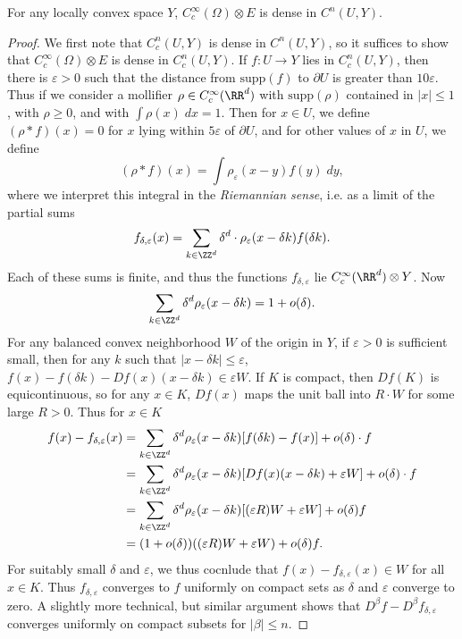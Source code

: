 \begin{lemma}
    For any locally convex space $Y$, $C_c^\infty(\Omega) \otimes E$ is dense in $C^n(U,Y)$.
\end{lemma}
\begin{proof}
    We first note that $C_c^n(U,Y)$ is dense in $C^n(U,Y)$, so it suffices to show that $C_c^\infty(\Omega) \otimes E$ is dense in $C_c^n(U,Y)$. If $f: U \to Y$ lies in $C_c^n(U,Y)$, then there is $\varepsilon > 0$ such that the distance from $\text{supp}(f)$ to $\partial U$ is greater than $10 \varepsilon$. Thus if we consider a mollifier $\rho \in C_c^\infty(\RR^d)$ with $\text{supp}(\rho)$ contained in $|x| \leq 1$, with $\rho \geq 0$, and with $\int \rho(x)\; dx = 1$. Then for $x \in U$, we define $(\rho * f)(x) = 0$ for $x$ lying within $5 \varepsilon$ of $\partial U$, and for other values of $x$ in $U$, we define
    \[ (\rho * f)(x) = \int \rho_\varepsilon(x - y) f(y)\; dy, \]
    where we interpret this integral in the \emph{Riemannian sense}, i.e. as a limit of the partial sums
    \[ f_{\delta,\varepsilon}(x) = \sum_{k \in \ZZ^d} \delta^d \cdot \rho_\varepsilon(x - \delta k) f(\delta k). \]
    Each of these sums is finite, and thus the functions $f_{\delta,\varepsilon}$ lie $C_c^\infty(\RR^d) \otimes Y$. Now
    \[ \sum_{k \in \ZZ^d} \delta^d \rho_\varepsilon(x - \delta k) = 1 + o(\delta). \]
    For any balanced convex neighborhood $W$ of the origin in $Y$, if $\varepsilon > 0$ is sufficient small, then for any $k$ such that $|x - \delta k| \leq \varepsilon$, $f(x) - f(\delta k) - Df(x)(x - \delta k) \in \varepsilon W$. If $K$ is compact, then $Df(K)$ is equicontinuous, so for any $x \in K$, $Df(x)$ maps the unit ball into $R \cdot W$ for some large $R > 0$. Thus for $x \in K$
    \begin{align*}
        f(x) - f_{\delta,\varepsilon}(x) &= \sum_{k \in \ZZ^d} \delta^d \rho_\varepsilon(x - \delta k) [f(\delta k) - f(x)] + o(\delta) \cdot f\\
        &= \sum_{k \in \ZZ^d} \delta^d \rho_\varepsilon(x - \delta k) [Df(x) (x - \delta k) + \varepsilon W] + o(\delta) \cdot f\\
        &= \sum_{k \in \ZZ^d} \delta^d \rho_\varepsilon(x - \delta k) [(\varepsilon R) W + \varepsilon W] + o(\delta) f\\
        &= (1 + o(\delta)) ((\varepsilon R) W + \varepsilon W) + o(\delta) f.
    \end{align*}
    For suitably small $\delta$ and $\varepsilon$, we thus cocnlude that $f(x) - f_{\delta,\varepsilon}(x) \in W$ for all $x \in K$. Thus $f_{\delta,\varepsilon}$ converges to $f$ uniformly on compact sets as $\delta$ and $\varepsilon$ converge to zero. A slightly more technical, but similar argument shows that $D^\beta f - D^\beta f_{\delta,\varepsilon}$ converges uniformly on compact subsets for $|\beta| \leq n$.
\end{proof}

